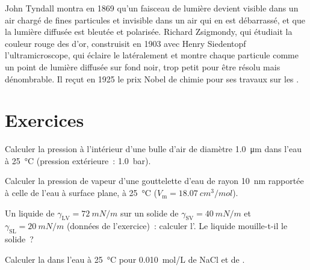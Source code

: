 \begin{history}
John Tyndall montra en 1869 qu'un faisceau de lumière devient visible
dans un air chargé de fines particules et invisible dans un air qui en
est débarrassé, et que la lumière diffusée est bleutée et polarisée.
Richard Zsigmondy, qui étudiait la couleur rouge des  d'or, construisit
en 1903 avec Henry Siedentopf l'ultramicroscope, qui éclaire le 
latéralement et montre chaque particule comme un point de lumière
diffusée sur fond noir, trop petit pour être résolu mais dénombrable. Il
reçut en 1925 le prix Nobel de chimie pour ses travaux sur les .
\end{history}

\section{Exercices}

\begin{exercise}[$\star$]\label{exo:b3:colloids:1}
Calculer la pression à l'intérieur d'une bulle d'air de diamètre
\qty{1.0}{\micro m} dans l'eau à
\qty{25}{\celsius} (pression extérieure~: \qty{1.0}{bar}).
\end{exercise}

\begin{exercise}[$\star$]\label{exo:b3:colloids:2}
Calculer la pression de vapeur d'une gouttelette d'eau de rayon
\qty{10}{nm} rapportée à celle de l'eau à surface plane, à
\qty{25}{\celsius} ($V_{\mathrm m} = \qty{18.07}{cm^3/mol}$).
\end{exercise}

\begin{exercise}[$\star$]\label{exo:b3:colloids:3}
Un liquide de $\gamma_{\mathrm{LV}} = \qty{72}{mN/m}$ sur un solide de $\gamma_{\mathrm{SV}} = \qty{40}{mN/m}$ et $\gamma_{\mathrm{SL}} =
\qty{20}{mN/m}$ (données de l'exercice)~: calculer l'.
Le liquide mouille-t-il le solide~?
\end{exercise}

\begin{exercise}[$\star$]\label{exo:b3:colloids:4}
Calculer la  dans l'eau à \qty{25}{\celsius} pour
\qty{0.010}{mol/L} de NaCl et de
.
\end{exercise}

